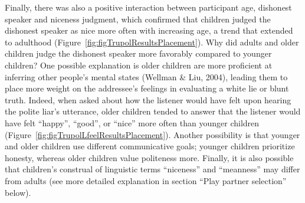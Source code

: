 \documentclass[oneside]{report}
\begin{document}
Finally, there was also a positive interaction between participant age,
dishonest speaker and niceness judgment, which confirmed that children
judged the dishonest speaker as nice more often with increasing age, a
trend that extended to adulthood
(Figure~\ref{fig:figTrupolResultsPlacement}). Why did adults and older
children judge the dishonest speaker more favorably compared to younger
children? One possible explanation is older children are more proficient
at inferring other people's mental states (Wellman \& Liu, 2004),
leading them to place more weight on the addressee's feelings in
evaluating a white lie or blunt truth. Indeed, when asked about how the
listener would have felt upon hearing the polite liar's utterance, older
children tended to answer that the listener would have felt ``happy'',
``good'', or ``nice'' more often than younger children
(Figure~\ref{fig:figTrupolLfeelResultsPlacement}). Another possibility
is that younger and older children use different communicative goals;
younger children prioritize honesty, whereas older children value
politeness more. Finally, it is also possible that children's construal
of linguistic terms ``niceness'' and ``meanness'' may differ from adults
(see more detailed explanation in section ``Play partner selection''
below).
\end{document}

